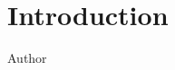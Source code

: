 \documentclass[../main.tex]{subfiles}
\begin{document}
\chapter{Introduction}
\label{ch:intro}

{ Author }


\end{document}
